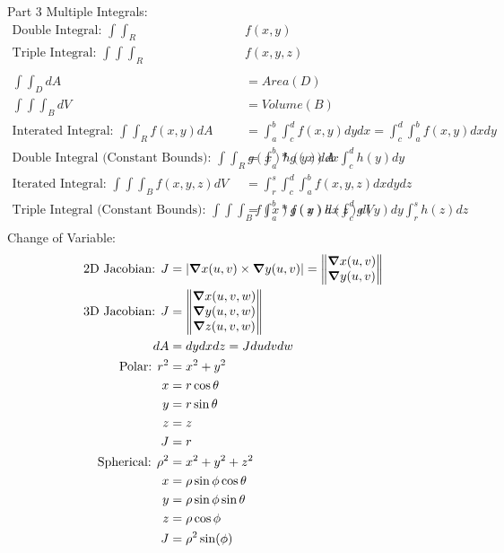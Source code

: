 \documentclass[12pt]{article}
\newcommand{\gv}[1]{\ensuremath{\mbox{\boldmath$ #1 $}}}
\newcommand{\grad}[1]{\gv{\nabla} #1} %
\renewcommand{\=}[1]{\stackrel{#1}{=}} %
\theoremstyle{definition}
\theoremstyle{remark}
\begin{document}
Part 3
Multiple Integrals:
\begin{align*}
  \textrm{Double Integral: } \int\int_R&f(x,y)\\
  \textrm{Triple Integral: } \int\int\int_R&f(x,y,z)\\\\
  \int\int_D dA &= Area(D)\\
  \int\int\int_B dV &= Volume(B) \\
  \textrm{Interated Integral: }\int\int_R f(x,y) dA &= \int_a^b \int_c^d f(x,y) dydx = \int_c^d
  \int_a^b f(x,y) dxdy\\
  \textrm{Double Integral (Constant Bounds): }\int\int_R g(x)h(y)dA &=
  \int_a^b*g(x) dx \int_c^d h(y) dy&\\  
  \textrm{Iterated Integral: } \int\int\int_Bf(x,y,z) dV &=
  \int_r^s\int_c^d\int_a^b f(x,y,z)dxdydz \\
  \textrm{Triple Integral (Constant Bounds): }\int\int\int_B f(x)g(y)h(z)dV &= \int_a^b*f(x) dx \int_c^d g(y) dy \int_r^sh(z)dz\\  
\end{align*}
Change of Variable:
\begin{align*}
 \textrm{2D Jacobian: }J &= |\grad x(u,v) \times \grad y(u,v)| =
  \begin{Vmatrix}
    \grad x(u,v)\\
    \grad y(u,v)\\
  \end{Vmatrix}\\
  \textrm{3D Jacobian: } J &=   
   \begin{Vmatrix}
    \grad x(u,v,w)\\
    \grad y(u,v,w)\\
    \grad z(u,v,w)\\
  \end{Vmatrix}\\
  dA &= dydxdz = Jdudvdw\\
  \textrm{Polar: } 
  r^2 &= x^2+ y^2\\
  x &= r\cos{\theta}\\
  y &= r\sin{\theta}\\
  z &= z\\
  J &= r\\
  \textrm{Spherical: } 
  \rho^2 &= x^2+y^2+z^2\\
  x &=\rho\sin{\phi}\cos{\theta}\\
  y &=\rho\sin{\phi}\sin{\theta}\\
  z &=\rho\cos{\phi}\\
  J &= \rho^2\sin(\phi)
\end{align*}
\end{document}
